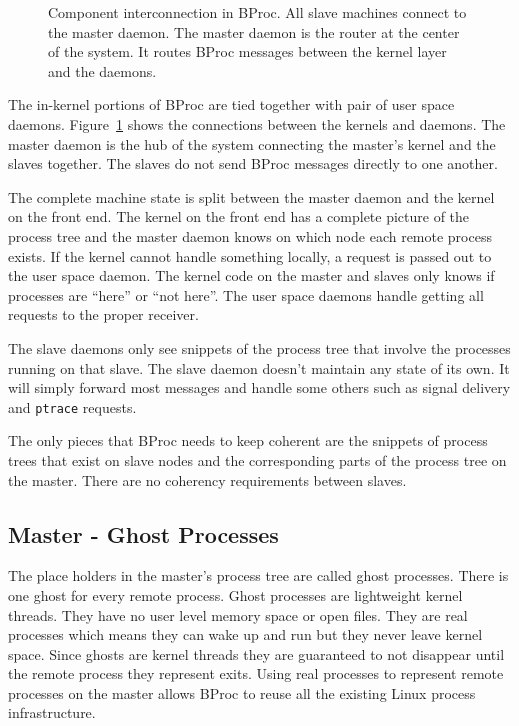 \begin{figure}
\begin{center}
\epsfxsize=4in

\caption{Component interconnection in BProc.  All slave machines
connect to the master daemon.  The master daemon is the router at the
center of the system.  It routes BProc messages between the kernel
layer and the daemons.}

\label{fig:daemons}
\end{center}
\end{figure}

The in-kernel portions of BProc are tied together with pair of user
space daemons.  Figure~\ref{fig:daemons} shows the connections between
the kernels and daemons.  The master daemon is the hub of the system
connecting the master's kernel and the slaves together.  The slaves do
not send BProc messages directly to one another.

The complete machine state is split between the master daemon and the
kernel on the front end.  The kernel on the front end has a complete
picture of the process tree and the master daemon knows on which node
each remote process exists.  If the kernel cannot handle something
locally, a request is passed out to the user space daemon.  The kernel
code on the master and slaves only knows if processes are ``here'' or
``not here''.  The user space daemons handle getting all requests to
the proper receiver.

The slave daemons only see snippets of the process tree that involve
the processes running on that slave.  The slave daemon doesn't
maintain any state of its own.  It will simply forward most messages
and handle some others such as signal delivery and \texttt{ptrace}
requests.

The only pieces that BProc needs to keep coherent are the snippets of
process trees that exist on slave nodes and the corresponding parts of
the process tree on the master.  There are no coherency requirements
between slaves.

\subsection{Master - Ghost Processes}
The place holders in the master's process tree are called ghost
processes.  There is one ghost for every remote process.  Ghost
processes are lightweight kernel threads.  They have no user level
memory space or open files.  They are real processes which means they
can wake up and run but they never leave kernel space.  Since ghosts
are kernel threads they are guaranteed to not disappear until the
remote process they represent exits.  Using real processes to
represent remote processes on the master allows BProc to reuse all the
existing Linux process infrastructure.

